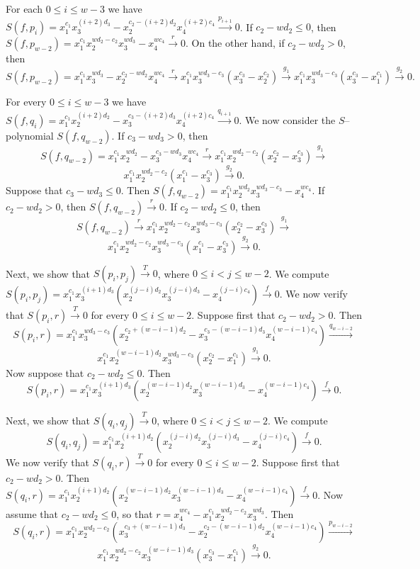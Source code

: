 \documentclass[10pt,a4paper]{amsart}
\begin{document}
For each $0 \leq i \leq w-3$ we have $S(f,p_{i})=x_{1}^{c_1}x_{3}^{(i+2)d_3}-x_{2}^{c_2-(i+2)d_2}x_{4}^{(i+2)c_4} \stackrel{p_{i+1}} {\longrightarrow} 0$. If $c_{2}-wd_{2} \leq 0$, then $S(f,p_{w-2})=x_{1}^{c_1}x_{2}^{wd_{2}-c_{2}}x_{3}^{wd_3}-x_{4}^{wc_4} \stackrel{r} {\longrightarrow} 0$. On the other hand, if $c_{2}-wd_{2}>0$, then $S(f,p_{w-2})=x_{1}^{c_1}x_{3}^{wd_3}-x_{2}^{c_{2}-wd_2}x_4^{wc_4} \stackrel{r} {\longrightarrow} x_1^{c_1}x_3^{wd_3-c_3}(x_{3}^{c_3}-x_{2}^{c_{2}}) \stackrel{g_1} {\longrightarrow} x_1^{c_1}x_3^{wd_3-c_3}(x_{3}^{c_3}-x_{1}^{c_{1}}) \stackrel{g_2} {\longrightarrow} 0.$

For every $0 \leq i \leq w-3$ we have $S(f,q_{i})=x_{1}^{c_1}x_{2}^{(i+2)d_2}-x_{3}^{c_3-(i+2)d_3}x_{4}^{(i+2)c_4} \stackrel{q_{i+1}} {\longrightarrow} 0$. We now consider the $S$--polynomial $S(f,q_{w-2})$. If $c_{3}-wd_{3}>0$, then \[ S(f,q_{w-2})=x_1^{c_1}x_2^{wd_2}-x_3^{c_3-wd_3}x_4^{wc_4}
\stackrel{r}{\longrightarrow}
x_1^{c_1}x_2^{wd_2-c_2}(x_2^{c_2}-x_3^{c_3})
\stackrel{g_1}{\longrightarrow} \] \[
x_1^{c_1}x_2^{wd_2-c_2}(x_1^{c_1}-x_3^{c_3})
\stackrel{g_2}{\longrightarrow}
0.
\]
Suppose that $c_3-wd_3 \leq 0$. Then $S(f,q_{w-2})=x_1^{c_1}x_2^{wd_2}x_3^{wd_3-c_3}-x_4^{wc_4}$. If $c_2-wd_2>0$, then $S(f,q_{w-2})\stackrel{r}{\longrightarrow}0$. If $c_2-wd_2 \leq 0$, then
\[
S(f,q_{w-2})
\stackrel{r}{\longrightarrow}
x_1^{c_1}x_2^{wd_2-c_2}x_3^{wd_3-c_3}(x_2^{c_2}-x_3^{c_3})
\stackrel{g_1}{\longrightarrow} \] \[
x_1^{c_1}x_2^{wd_2-c_2}x_3^{wd_3-c_3}(x_1^{c_1}-x_3^{c_3})
\stackrel{g_2}{\longrightarrow}
0.\]

Next, we show that $S(p_{i},p_{j}) \stackrel{T}{\longrightarrow} 0$, where $0 \leq i<j \leq w-2$. We compute $S(p_{i},p_{j})=x_{1}^{c_1}x_{3}^{(i+1)d_3}(x_{2}^{(j-i)d_{2}}x_{3}^{(j-i)d_{3}}-x_{4}^{(j-i)c_4}) \stackrel{f}{\longrightarrow} 0$. We now verify that $S(p_i,r) \stackrel{T} {\longrightarrow} 0$ for every $0 \leq i \leq w-2$. Suppose first that $c_2-wd_2>0$. Then $$S(p_i,r)=x_{1}^{c_1}x_{3}^{wd_{3}-c_3}(x_{2}^{c_2+(w-i-1)d_{2}}-x_{3}^{c_{3}-(w-i-1)d_{3}}x_{4}^{(w-i-1)c_{4}}) \stackrel{q_{w-i-2}} {\longrightarrow}$$ $$x_{1}^{c_1}x_{2}^{(w-i-1)d_{2}}x_{3}^{wd_{3}-c_3}(x_{2}^{c_2}-x_{1}^{c_{1}}) \stackrel{g_{1}} {\longrightarrow} 0.$$ Now suppose that $c_2-wd_2 \leq 0$. Then $$S(p_i,r)=x_{1}^{c_1}x_{3}^{(i+1)d_3}(x_{2}^{(w-i-1)d_2}x_{3}^{(w-i-1)d_3}-x_{4}^{(w-i-1)c_4}) \stackrel{f} {\longrightarrow} 0.$$

Next, we show that $S(q_{i},q_{j}) \stackrel{T}{\longrightarrow} 0$, where $0 \leq i<j \leq w-2$. We compute $$S(q_{i},q_{j})=x_{1}^{c_1}x_{2}^{(i+1)d_2}(x_{2}^{(j-i)d_{2}}x_{3}^{(j-i)d_{3}}-x_{4}^{(j-i)c_4}) \stackrel{f}{\longrightarrow} 0.$$ We now verify that $S(q_i,r) \stackrel{T} {\longrightarrow} 0$ for every $0 \leq i \leq w-2$. Suppose first that $c_2-wd_2>0$. Then $S(q_i,r)=x_{1}^{c_1}x_{2}^{(i+1)d_2}(x_{2}^{(w-i-1)d_2}x_{3}^{(w-i-1)d_3}-x_{4}^{(w-i-1)c_4}) \stackrel{f} {\longrightarrow}  0$. Now assume that $c_2-wd_2 \leq 0$, so that 
$r=x_4^{wc_4}-x_1^{c_1}x_2^{wd_2-c_2}x_3^{wd_3}$. Then $$S(q_i,r)=x_{1}^{c_1}x_{2}^{wd_{2}-c_2}(x_{3}^{c_3+(w-i-1)d_{3}}-x_{2}^{c_{2}-(w-i-1)d_{2}}x_{4}^{(w-i-1)c_{4}}) \stackrel{p_{w-i-2}} {\longrightarrow}$$ $$x_{1}^{c_1}x_{2}^{wd_{2}-c_2}x_{3}^{(w-i-1)d_{3}}(x_{3}^{c_3}-x_{1}^{c_{1}}) \stackrel{g_{2}} {\longrightarrow} 0.$$
\end{document}
